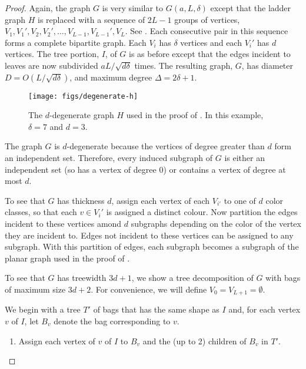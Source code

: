 \documentclass{patmorin}
\begin{document}
\begin{proof}
  Again, the graph $G$ is very similar to $G(a, L,\delta)$ except that
  the ladder graph $H$ is replaced with a sequence of $2L-1$ groups
  of vertices, $V_{1},V_{1}',V_2,V_2',\ldots,V_{L-1},V_{L-1}',V_L$.
  See .  Each consecutive pair in this sequence
  forms a complete bipartite graph.  Each $V_i$ has $\delta$ vertices
  and each $V_i'$ has $d$ vertices.  The tree portion, $I$, of $G$ is
  as before except that the edges incident to leaves are now subdivided
  $aL/\sqrt{d\delta}$ times.  The resulting graph, $G$, has diameter
  $D=O(L/\sqrt{d\delta})$, and maximum degree $\Delta = 2\delta+1$.

  \begin{figure}
    \begin{center}
       \texttt{[image: figs/degenerate-h]}
    \end{center}
    \caption{The $d$-degenerate graph $H$ used in the proof of
       . In this example, $\delta=7$
        and $d=3$.}
  \end{figure}

  The graph $G$ is $d$-degenerate because the vertices of degree greater
  than $d$ form an independent set. Therefore, every induced subgraph
  of $G$ is either an independent set (so has a vertex of degree 0)
  or contains a vertex of degree at most $d$.

  To see that $G$ has thickness $d$, assign each vertex of each
  $V_{i'}$ to one of $d$ color classes, so that each $v\in V_i'$ is
  assigned a distinct colour.   Now partition the edges incident to
  these vertices amond $d$ subgraphs depending on the color of the
  vertex they are incident to.  Edges not incident to these vertices
  can be assigned to any subgraph.  With this partition of edges, each
  subgraph becomes a subgraph of the planar graph used in the proof of
  .

  To see that $G$ has treewidth $3d+1$, we show a tree decomposition
  of $G$ with bags of maximum size $3d+2$.  For convenience, we will
  define $V_0=V_{L+1}=\emptyset$.

  We begin with a tree $T'$ of bags that has the same shape as $I$ and,
  for each vertex $v$ of $I$, let $B_v$ denote the bag corresponding
  to $v$.
  \begin{enumerate}
    \item Assign each vertex of $v$ of $I$ to $B_v$ and the (up to 2)
      children of $B_v$ in $T'$.


\end{enumerate}
\end{proof}
\end{document}
